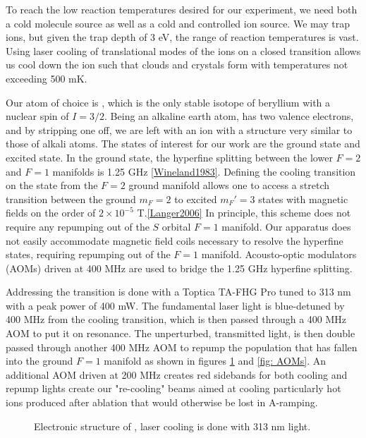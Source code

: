 To reach the low reaction temperatures desired for our experiment, we need both a cold molecule source as well as a cold and controlled ion source. We may trap  ions, but given the trap depth of 3 eV, the range of reaction temperatures is vast. Using laser cooling of translational modes of the ions on a closed transition allows us cool down the ion such that clouds and crystals form with temperatures not exceeding 500 mK.\cite{Wineland1979}

Our atom of choice is , which is the only stable isotope of beryllium with a nuclear spin of $I=3/2$. Being an alkaline earth atom,  has two valence electrons, and by stripping one off, we are left with an ion with a structure very similar to those of alkali atoms. The states of interest for our work are the  ground state and  excited state. In the ground state, the hyperfine splitting between the lower $F=2$ and $F=1$ manifolds is 1.25 GHz \ref{Wineland1983}. Defining the cooling transition on the  state from the $F=2$ ground manifold allows one to access a stretch transition between the ground $m_F=2$ to excited $m_F'=3$ states with magnetic fields on the order of $2 \times 10^{-5}$ T.\ref{Langer2006} In principle, this scheme does not require any repumping out of the $S$ orbital $F=1$ manifold. Our apparatus does not easily accommodate magnetic field coils necessary to resolve the hyperfine states, requiring repumping out of the $F=1$ manifold. Acousto-optic modulators (AOMs) driven at 400 MHz are used to bridge the 1.25 GHz hyperfine splitting.

Addressing the  transition is done with a Toptica TA-FHG Pro tuned to 313 nm with a peak power of 400 mW. The fundamental laser light is blue-detuned by 400 MHz from the cooling transition, which is then passed through a 400 MHz AOM to put it on resonance. The unperturbed, transmitted light, is then double passed through another 400 MHz AOM to repump the population that has fallen into the ground $F=1$ manifold as shown in figures \ref{fig: Be structure} and \ref{fig: AOMs}. An additional AOM driven at 200 MHz creates red sidebands for both cooling and repump lights create our "re-cooling" beams aimed at cooling particularly hot  ions produced after ablation that would otherwise be lost in A-ramping.

\begin{figure}[H]
	\centering
	\caption{Electronic structure of , laser cooling is done with 313 nm light.}
	\label{fig: Be structure}
\end{figure}

